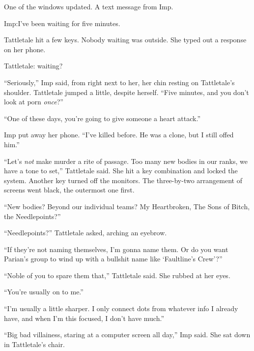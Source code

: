One of the windows updated.  A text message from Imp.



Imp:I've been waiting for five minutes.



Tattletale hit a few keys.  Nobody waiting was outside.  She typed out a response on her phone.



Tattletale:
waiting?



``Seriously,'' Imp said, from right next to her, her chin resting on Tattletale's shoulder.  Tattletale jumped a little, despite herself.  ``Five minutes, and you don't look at porn \emph{once}?''



``One of these days, you're going to give someone a heart attack.''



Imp put away her phone.  ``I've killed before.  He was a clone, but I still offed him.''



``Let's \emph{not} make murder a rite of passage.  Too many new bodies in our ranks, we have a tone to set,'' Tattletale said.  She hit a key combination and locked the system.  Another key turned off the monitors.  The three-by-two arrangement of screens went black, the outermost one first.



``New bodies?  Beyond our individual teams?  My Heartbroken, The Sons of Bitch, the Needlepoints?''



``Needlepoints?'' Tattletale asked, arching an eyebrow.



``If they're not naming themselves, I'm gonna name them.  Or do you want Parian's group to wind up with a bullshit name like `Faultline's Crew'?''



``Noble of you to spare them that,'' Tattletale said.  She rubbed at her eyes.



``You're usually on to me.''



``I'm usually a little sharper.  I only connect dots from whatever info I already have, and when I'm this focused, I don't have much.''



``Big bad villainess, staring at a computer screen all day,'' Imp said.  She sat down in Tattletale's chair.



